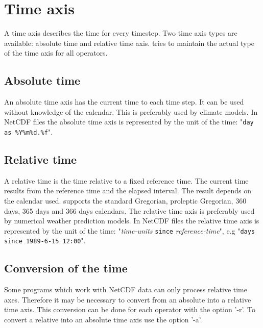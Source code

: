 \section{Time axis}

A time axis describes the time for every timestep.
Two time axis types are available: absolute time and relative time axis.
{\CDO} tries to maintain the actual type of the time axis for all operators.

\subsection{Absolute time}

An absolute time axis has the current time to each time step.
It can be used without knowledge of the calendar.
This is preferably used by climate models.
In NetCDF files the absolute time axis is represented by the 
unit of the time: {"{\tt day as \%Y\%m\%d.\%f}"}.

\subsection{Relative time}

A relative time is the time relative to a fixed reference time.
The current time results from the reference time and the elapsed interval.
The result depends on the calendar used.
{\CDO} supports the standard Gregorian, proleptic Gregorian, 360 days, 365 days and 366 days calendars.
The relative time axis is preferably used by numerical weather prediction models.
In NetCDF files the relative time axis is represented by the 
unit of the time: {"{\it time-units} {\tt since} {\it reference-time}"},
e.g "{\tt days since 1989-6-15 12:00}".

\subsection{Conversion of the time}

Some programs which work with NetCDF data can only process relative time axes.
Therefore it may be necessary to convert from an absolute into a relative time axis.
This conversion can be done for each operator with the {\CDO} option '-r'.
To convert a relative into an absolute time axis use the {\CDO} option '-a'.

